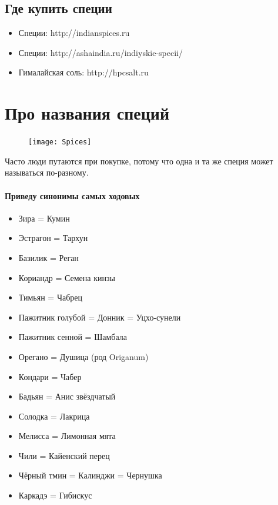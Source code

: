 \subsection{Где купить специи}
\begin{itemize}
\item Специи: http://indianspices.ru
\item Специи: http://ashaindia.ru/indiyskie-specii/
\item Гималайская соль: http://hpcsalt.ru
\end{itemize}

% 

\section{Про названия специй}

\begin{figure}[ht]
    \centering
    \texttt{[image: Spices]}
\end{figure} 
Часто люди путаются при покупке, потому что одна и та же специя может называться по-разному. \paragraph{Приведу синонимы самых ходовых}
\begin{itemize}

\item Зира = Кумин
\item Эстрагон = Тархун
\item Базилик = Реган
\item Кориандр = Семена кинзы
\item Тимьян = Чабрец
\item Пажитник голубой = Донник = Уцхо-сунели
\item Пажитник сенной = Шамбала
\item Орегано = Душица (род Origanum)
\item Кондари = Чабер
\item Бадьян = Анис звёздчатый
\item Солодка = Лакрица
\item Мелисса = Лимонная мята
\item Чили = Кайенский перец
\item Чёрный тмин = Калинджи = Чернушка
\item Каркадэ = Гибискус

\end{itemize}
